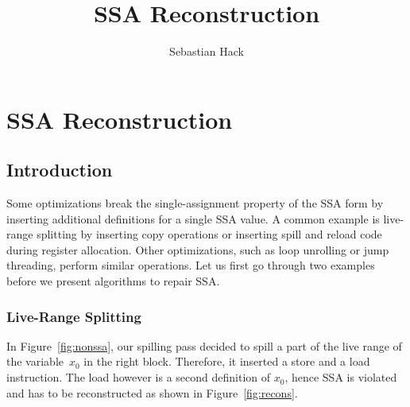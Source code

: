 
\newcommand{\var}[1]{\mathtt{#1}}

\title{SSA Reconstruction}
\author{Sebastian Hack}

\chapter{SSA Reconstruction }
\graphicspath{{repair_maintain_ssa_after_optimization/}{part1/repair_maintain_ssa_after_optimization/}}

\section{Introduction}

Some optimizations break the single-assignment property of the SSA form by inserting additional definitions for a single SSA value.
A common example is live-range splitting by inserting copy operations or inserting spill and reload code during register allocation.
Other optimizations, such as loop unrolling or jump threading, perform similar operations.
Let us first go through two examples before we present algorithms to repair SSA.

\subsection{Live-Range Splitting}

In Figure~\ref{fig:nonssa}, our spilling pass decided to spill a part of the live range of the variable~$x_0$ in the right block.
Therefore, it inserted a store and a load instruction. 
The load however is a second definition of $x_0$, hence SSA is violated and has to be reconstructed as shown in Figure~\ref{fig:recons}.

